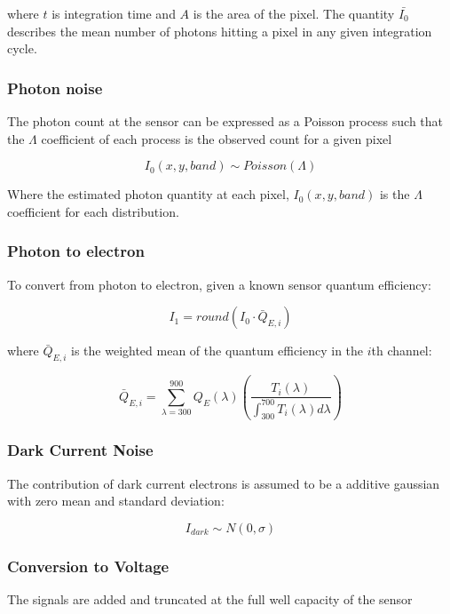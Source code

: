 \documentclass[10pt,a4paper,final,twocolumn]{article}
\begin{document}
where $t$ is integration time and $A$ is the area of the pixel. The quantity $\bar{I_0}$  describes the mean number of photons hitting a pixel in any given integration cycle.

\subsubsection{Photon noise}
The photon count at the sensor can be expressed as a Poisson process such that the $\Lambda$ coefficient of each process is the observed count for a given pixel

\begin{equation}
I_0(x, y, band) \sim Poisson(\Lambda)
\end{equation}

Where the estimated photon quantity at each pixel, ${I_0}(x, y, band)$ is the $\Lambda$ coefficient for each distribution.

\subsubsection{Photon to electron}
To convert from photon to electron, given a known sensor quantum efficiency:

\begin{equation}
I_1 =  round(I_0 \cdot \bar{Q}_{E,i})
\end{equation}

where $\bar{Q}_{E,i}$ is the weighted mean of the quantum efficiency in the $i$th channel:

\begin{equation}
\bar{Q}_{E, i} = \sum_{\lambda=300}^{900} Q_{E}(\lambda) \left(\frac{T_i(\lambda)}{\int_{300}^{700} T_i(\lambda) d\lambda}\right)
\end{equation}



\subsubsection{Dark Current Noise}
The contribution of dark current electrons is assumed to be a additive gaussian with zero mean and standard deviation:

\begin{equation}
I_{dark}\sim N(0, \sigma)
\end{equation}

\subsubsection{Conversion to Voltage}
The signals are added and truncated at the full well capacity of the sensor
\end{document}
